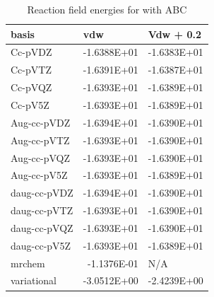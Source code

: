 \documentclass[../master_thesis.tex]{subfiles}
\begin{document}
\begin{table}[htbp]
\caption{Reaction field  energies for  with \ac{ABC}}
\begin{tabular}{|l|r|r|}
\hline
basis & \multicolumn{1}{l|}{vdw} & \multicolumn{1}{l|}{Vdw + 0.2} \\ \hline
Cc-pVDZ & -1.6388E+01 & -1.6383E+01 \\ \hline
Cc-pVTZ & -1.6391E+01 & -1.6387E+01 \\ \hline
Cc-pVQZ & -1.6393E+01 & -1.6389E+01 \\ \hline
Cc-pV5Z & -1.6393E+01 & -1.6389E+01 \\ \hline
Aug-cc-pVDZ & -1.6394E+01 & -1.6390E+01 \\ \hline
Aug-cc-pVTZ & -1.6393E+01 & -1.6390E+01 \\ \hline
Aug-cc-pVQZ & -1.6393E+01 & -1.6390E+01 \\ \hline
Aug-cc-pV5Z & -1.6393E+01 & -1.6389E+01 \\ \hline
daug-cc-pVDZ & -1.6394E+01 & -1.6390E+01 \\ \hline
daug-cc-pVTZ & -1.6393E+01 & -1.6390E+01 \\ \hline
daug-cc-pVQZ & -1.6393E+01 & -1.6390E+01 \\ \hline
daug-cc-pV5Z & -1.6393E+01 & -1.6389E+01 \\ \hline
mrchem & -1.1376E-01 & \multicolumn{1}{l|}{N/A} \\ \hline
variational & -3.0512E+00 & -2.4239E+00 \\ \hline
\end{tabular}
\label{tab:abcErcyan}
\end{table}
\end{document}
